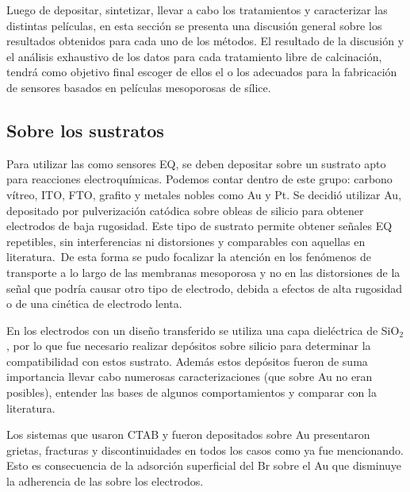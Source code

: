 			Luego de depositar, sintetizar, llevar a cabo los tratamientos y caracterizar las distintas películas, en esta sección se presenta una discusión general sobre los resultados obtenidos para cada uno de los métodos. El resultado de la discusión y el análisis exhaustivo de los datos para cada tratamiento libre de calcinación, tendrá como objetivo final escoger de ellos el o los adecuados para la fabricación de sensores basados en películas mesoporosas de sílice.

	\subsection{Sobre los sustratos}

			Para utilizar las \pdm\space como sensores EQ, se deben depositar sobre un sustrato apto para reacciones electroquímicas. Podemos contar dentro de este grupo: carbono vítreo, ITO, FTO, grafito y metales nobles como Au y Pt. Se decidió utilizar Au, depositado por pulverización catódica sobre obleas de silicio para obtener electrodos de baja rugosidad. Este tipo de sustrato permite obtener señales EQ repetibles, sin interferencias ni distorsiones y comparables con aquellas en literatura.\  De esta forma se pudo focalizar la atención en los fenómenos de transporte a lo largo de las membranas mesoporosa y no en las distorsiones de la señal que podría causar otro tipo de electrodo, debida a efectos de alta rugosidad o de una cinética de electrodo lenta.\cite{Wi2000,Bockris1974}
		
		    En los electrodos con un diseño transferido se utiliza una capa dieléctrica de SiO$_2$, por lo que fue necesario realizar depósitos sobre silicio para determinar la compatibilidad con estos sustrato. Además estos depósitos fueron de suma importancia llevar cabo numerosas caracterizaciones (que sobre Au no eran posibles), entender las bases de algunos comportamientos y comparar con la literatura.

			Los sistemas que usaron CTAB y fueron depositados sobre Au presentaron grietas, fracturas y discontinuidades en todos los casos como ya fue mencionando. Esto es consecuencia de la adsorción superficial del Br sobre el Au que disminuye la adherencia de las \pdm\space sobre los electrodos. 

